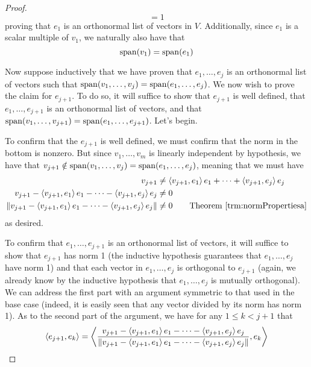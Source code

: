\documentclass[../main.tex]{subfiles}
\begin{document}
\begin{itemize}
\begin{theorem}
\begin{proof}
\begin{equation*}
                = 1
            \end{equation*}
            proving that $e_1$ is an orthonormal list of vectors in $V$. Additionally, since $e_1$ is a scalar multiple of $v_1$, we naturally also have that
            \begin{equation*}
                \operatorname{span}(v_1) = \operatorname{span}(e_1)
            \end{equation*}\par\smallskip
            Now suppose inductively that we have proven that $e_1,\dots,e_j$ is an orthonormal list of vectors such that $\operatorname{span}(v_1,\dots,v_j)=\operatorname{span}(e_1,\dots,e_j)$. We now wish to prove the claim for $e_{j+1}$. To do so, it will suffice to show that $e_{j+1}$ is well defined, that $e_1,\dots,e_{j+1}$ is an orthonormal list of vectors, and that $\operatorname{span}(v_1,\dots,v_{j+1})=\operatorname{span}(e_1,\dots,e_{j+1})$. Let's begin.\par
            To confirm that the $e_{j+1}$ is well defined, we must confirm that the norm in the bottom is nonzero. But since $v_1,\dots,v_m$ is linearly independent by hypothesis, we have that $v_{j+1}\notin\operatorname{span}(v_1,\dots,v_j)=\operatorname{span}(e_1,\dots,e_j)$, meaning that we must have
            \begin{align*}
                v_{j+1} &\neq \inp{v_{j+1}}{e_1}e_1+\cdots+\inp{v_{j+1}}{e_j}e_j\\
                v_{j+1}-\inp{v_{j+1}}{e_1}e_1-\cdots-\inp{v_{j+1}}{e_j}e_j &\neq 0\\
                \norm{v_{j+1}-\inp{v_{j+1}}{e_1}e_1-\cdots-\inp{v_{j+1}}{e_j}e_j} &\neq 0\tag*{Theorem \ref{trm:normPropertiesa}}
            \end{align*}
            as desired.\par
            To confirm that $e_1,\dots,e_{j+1}$ is an orthonormal list of vectors, it will suffice to show that $e_{j+1}$ has norm 1 (the inductive hypothesis guarantees that $e_1,\dots,e_j$ have norm 1) and that each vector in $e_1,\dots,e_j$ is orthogonal to $e_{j+1}$ (again, we already know by the inductive hypothesis that $e_1,\dots,e_j$ is mutually orthogonal). We can address the first part with an argument symmetric to that used in the base case (indeed, it is easily seen that any vector divided by its norm has norm 1). As to the second part of the argument, we have for any $1\leq k<j+1$ that
            \begin{align*}
                \inp{e_{j+1}}{e_k} &= \inp{\frac{v_{j+1}-\inp{v_{j+1}}{e_1}e_1-\cdots-\inp{v_{j+1}}{e_j}e_j}{\norm{v_{j+1}-\inp{v_{j+1}}{e_1}e_1-\cdots-\inp{v_{j+1}}{e_j}e_j}}}{e_k}\\

\end{align*}
\end{proof}
\end{theorem}
\end{itemize}
\end{document}
